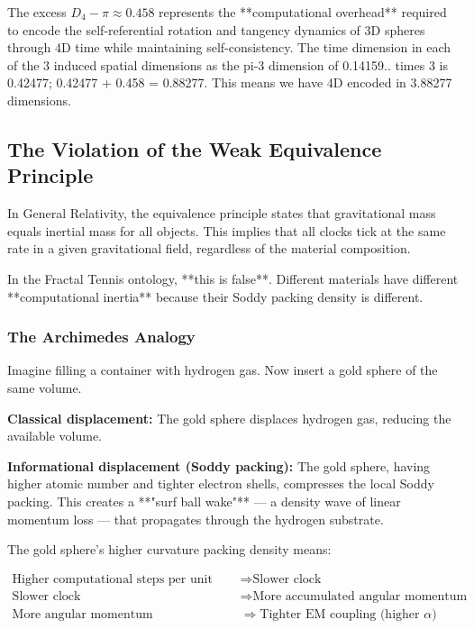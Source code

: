 \documentclass[11pt,a4paper]{article}
\begin{document}
    The excess $D_4 - \pi \approx 0.458$ represents the **computational overhead** required to encode the self-referential rotation and tangency dynamics of 3D spheres through 4D time while maintaining self-consistency.
    The time dimension in each of the 3 induced spatial dimensions as the pi-3 dimension of 0.14159.. times 3 is 0.42477; 0.42477 + 0.458 = 0.88277. This means we have 4D encoded in 3.88277 dimensions.

  \subsection{The Violation of the Weak Equivalence Principle}

    In General Relativity, the equivalence principle states that gravitational mass equals inertial mass for all objects. This implies that all clocks tick at the same rate in a given gravitational field, regardless of the material composition.

    In the Fractal Tennis ontology, **this is false**. Different materials have different **computational inertia** because their Soddy packing density is different.

    \subsubsection{The Archimedes Analogy}

      Imagine filling a container with hydrogen gas. Now insert a gold sphere of the same volume.

      \noindent\textbf{Classical displacement:} The gold sphere displaces hydrogen gas, reducing the available volume.

      \noindent\textbf{Informational displacement (Soddy packing):} The gold sphere, having higher atomic number and tighter electron shells, compresses the local Soddy packing. This creates a **"surf ball wake"** — a density wave of linear momentum loss — that propagates through the hydrogen substrate.

      The gold sphere's higher curvature packing density means:

      \begin{align*}
      \text{Higher computational steps per unit time} &\Rightarrow \text{Slower clock} \\
      \text{Slower clock} &\Rightarrow \text{More accumulated angular momentum} \\
      \text{More angular momentum} &\Rightarrow \text{Tighter EM coupling (higher } \alpha) \\
      \end{align*}
\end{document}
